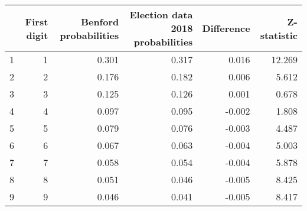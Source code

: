 \begin{tabular}{lrrrrr}
\toprule
 & First digit & Benford probabilities & Election data 2018 probabilities & Difference & Z-statistic \\
\midrule
1 & 1 & 0.301 & 0.317 & 0.016 & 12.269 \\
2 & 2 & 0.176 & 0.182 & 0.006 & 5.612 \\
3 & 3 & 0.125 & 0.126 & 0.001 & 0.678 \\
4 & 4 & 0.097 & 0.095 & -0.002 & 1.808 \\
5 & 5 & 0.079 & 0.076 & -0.003 & 4.487 \\
6 & 6 & 0.067 & 0.063 & -0.004 & 5.003 \\
7 & 7 & 0.058 & 0.054 & -0.004 & 5.878 \\
8 & 8 & 0.051 & 0.046 & -0.005 & 8.425 \\
9 & 9 & 0.046 & 0.041 & -0.005 & 8.417 \\
\bottomrule
\end{tabular}
